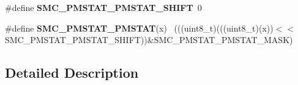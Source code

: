 \begin{DoxyCompactItemize}
\item 
\hypertarget{group___s_m_c___register___masks_gaa4083ab43677e6a1b6832f6607a5ef0e}{}\#define {\bfseries S\+M\+C\+\_\+\+P\+M\+S\+T\+A\+T\+\_\+\+P\+M\+S\+T\+A\+T\+\_\+\+S\+H\+I\+F\+T}~0\label{group___s_m_c___register___masks_gaa4083ab43677e6a1b6832f6607a5ef0e}

\item 
\hypertarget{group___s_m_c___register___masks_gaf42160e08664669fce172fdc170e9c5f}{}\#define {\bfseries S\+M\+C\+\_\+\+P\+M\+S\+T\+A\+T\+\_\+\+P\+M\+S\+T\+A\+T}(x)                                      ~(((uint8\+\_\+t)(((uint8\+\_\+t)(x))$<$$<$S\+M\+C\+\_\+\+P\+M\+S\+T\+A\+T\+\_\+\+P\+M\+S\+T\+A\+T\+\_\+\+S\+H\+I\+F\+T))\&S\+M\+C\+\_\+\+P\+M\+S\+T\+A\+T\+\_\+\+P\+M\+S\+T\+A\+T\+\_\+\+M\+A\+S\+K)\label{group___s_m_c___register___masks_gaf42160e08664669fce172fdc170e9c5f}

\end{DoxyCompactItemize}


\subsection{Detailed Description}
